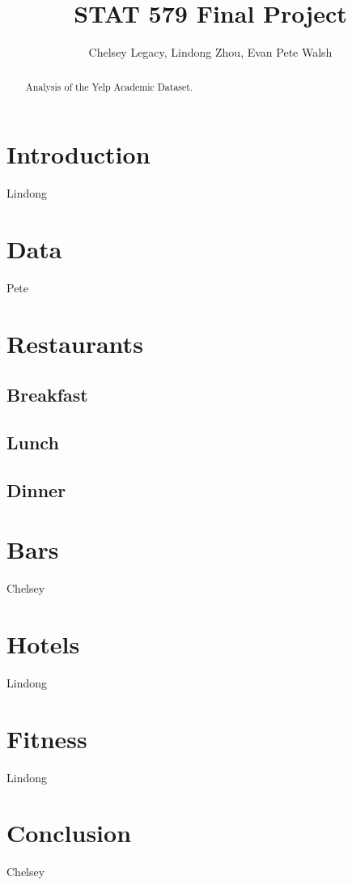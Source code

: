 \documentclass[12pt]{article}
\begin{document}
\author{Chelsey Legacy, Lindong Zhou, Evan Pete Walsh}
\title{STAT 579 Final Project}
\maketitle

\begin{abstract}
Analysis of the Yelp Academic Dataset.
\end{abstract}

\newpage

\tableofcontents

\newpage

\pagestyle{fancy}
\rhead{\thepage}
\rfoot{\today}
\cfoot{}%


\section{Introduction}

Lindong


\section{Data}

Pete


\section{Restaurants}

\subsection{Breakfast}

\subsection{Lunch}

\subsection{Dinner}

\section{Bars}

Chelsey

\section{Hotels}

Lindong

\section{Fitness}

Lindong


\section{Conclusion}


Chelsey
\end{document}

